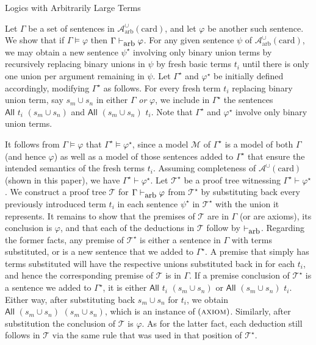\documentclass[letterpaper]{article} %
\theoremstyle{definition}
\newcommand{\Model}{\mathcal{M}}
\newcommand{\proves}{\vdash}
\newcommand{\Aunion}{\mathscr{A}^{\cup}}
\newcommand{\proverule}{\textsc}
\newcommand{\axiom}{\proverule{axiom}}
\newcommand{\All}[2]{\mathsf{All}\,\,#1\,\,#2}
\newcommand{\card}{\mathrm{card}}
\newcommand{\provesarbitrary}{\proves_{\mbox{\small{arb}}}}
\begin{document}
\begin{subsection}{Logics with Arbitrarily Large Terms}
{Let $\Gamma$ be a set of sentences in $\Aunion_\mathrm{arb}(\card)$, and let $\varphi$ be another such sentence.  We show that if $\Gamma \models \varphi$ then $\Gamma \provesarbitrary \varphi$. For any given sentence $\psi$ of $\Aunion_\mathrm{arb}(\card)$, we may obtain a new sentence $\psi^\star$ involving only binary union terms by recursively replacing binary unions in $\psi$ by fresh basic terms $t_i$ until there is only one union per argument remaining in $\psi$.  
Let $\Gamma^\star$ and $\varphi^\star$ be initially defined accordingly, modifying $\Gamma^\star$ as follows.  For every fresh term $t_i$ replacing binary union term, say $s_m \cup s_n$ in either $\Gamma$ \emph{or} $\varphi$, we include in $\Gamma^\star$ the sentences $\All{t_i}{(s_m \cup s_n)}$ and $\All{(s_m \cup s_n)}{t_i}$.  Note that $\Gamma^\star$ and $\varphi^\star$ involve only binary union terms.

It follows from $\Gamma \models \varphi$ that $\Gamma^\star \models \varphi^\star$, since a model $\Model$ of $\Gamma^\star$ is a model of both $\Gamma$ (and hence $\varphi$) as well as a model of those sentences added to $\Gamma^\star$ that ensure the intended semantics of the fresh terms $t_i$.  Assuming completeness of $\Aunion(\card)$ (shown in this paper), we have $\Gamma^\star \proves \varphi^\star$.  Let $\mathcal{T}^\star$ be a proof tree witnessing $\Gamma^\star \proves \varphi^\star$.  We construct a proof tree $\mathcal{T}$ for $\Gamma \provesarbitrary \varphi$ from $\mathcal{T}^\star$ by substituting back every previously introduced term $t_i$ in each sentence $\psi^\star$ in $\mathcal{T}^\star$ with the union it represents.  It remains to show that the premises of $\mathcal{T}$ are in $\Gamma$ (or are axioms), its conclusion is $\varphi$, and that each of the deductions in $\mathcal{T}$ follow by $\provesarbitrary$.  
Regarding the former facts, any premise of $\mathcal{T}^\star$ is either a sentence in $\Gamma$ with terms substituted, or is a new sentence that we added to $\Gamma^\star$.  A premise that simply has terms substituted will have the respective unions substituted back in for each $t_i$, and hence the corresponding premise of $\mathcal{T}$ is in $\Gamma$.  If a premise conclusion of $\mathcal{T}^\star$ is a sentence we added to $\Gamma^\star$, it is either $\All{t_i}{(s_m \cup s_n)}$ or $\All{(s_m \cup s_n)}{t_i}$.  Either way, after substituting back $s_m \cup s_n$ for $t_i$, we obtain $\All{(s_m \cup s_n)}{(s_m \cup s_n)}$, which is an instance of $(\axiom)$.  Similarly, after substitution the conclusion of $\mathcal{T}$ is $\varphi$.  As for the latter fact, each deduction still follows in $\mathcal{T}$ via the same rule that was used in that position of $\mathcal{T}^\star$.
}

\label{subsection-arbitraryterms}
\end{subsection}
\end{document}
